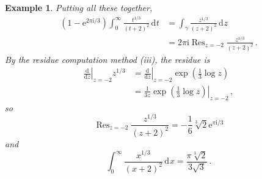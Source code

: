 \documentclass{article}
\theoremstyle{plain}\theoremheaderfont{\normalfont\itshape}\theorembodyfont{\rmfamily}\theoremseparator{.}\newtheorem*{rem}{Remark}\newtheorem*{ex}{Example}\newtheorem*{proof}{Proof}\newtheorem*{altp}{Alternative proof}\newtheorem*{con}{Consequences}\newtheorem*{notn}{Notations}\newtheorem*{cau}{Caution}\newtheorem*{term}{Terminology}\newtheorem*{keyex}{Key example}
\theoremstyle{plain}\theoremheaderfont{\normalfont\bfseries}\theorembodyfont{\rmfamily}\theoremseparator{.}\newtheorem{thm}{Theorem}[section]\newtheorem{lem}[thm]{Lemma}\newtheorem{prop}[thm]{Proposition}\newtheorem*{cor}{Corollary}\newtheorem{defn}[thm]{Definition}\newtheorem{clm}[thm]{Claim}\newtheorem{clminproof}{Claim}\newtheorem{leminproof}{Lemma}\newtheorem{app}{Application}
\theoremstyle{break}\theoremheaderfont{\normalfont\itshape}\theorembodyfont{\rmfamily}\theoremseparator{.\medskip}\newtheorem*{proofskip}{Proof}\newtheorem*{exs}{Examples}\newtheorem*{rems}{Remarks}\newtheorem*{rec}{Recall}\newtheorem*{ppts}{Properties}
\theoremstyle{break}\theoremheaderfont{\normalfont\bfseries}\theorembodyfont{\rmfamily}\theoremseparator{.\medskip}\newtheorem{lemskip}[thm]{Lemma}\newtheorem{defnskip}[thm]{Definition}\newtheorem{propskip}[thm]{Proposition}\newtheorem{thmskip}[thm]{Theorem}
\numberwithin{equation}{section}
\newcommand{\ii}{\mathrm{i}}
\newcommand{\ee}{\mathrm{e}}
\DeclareMathOperator*{\Res}{Res}
\newcommand{\dd}[2][]{\,\mathrm{d}^{#1} #2}
\newcommand{\dv}[2]{\frac{\mathrm{d}#1}{\mathrm{d}#2}}
\begin{document}
\begin{ex}
        Putting all these together,
        \begin{align*}
            (1-\ee^{2\pi \ii/3})\int_{0}^{\infty}\frac{t^{1/3}}{(t+2)^2}\dd{t}&=\int_{\gamma}\frac{z^{1/3}}{(z+2)^2}\dd{z}\\
            &=2\pi \ii\Res_{z=-2}\frac{z^{1/3}}{(z+2)^2}\,.
        \end{align*}
        By the residue computation method (iii), the residue is
        \begin{align*}
            \left.\dv{}{z}\right|_{z=-2}z^{1/3}&=\left.\dv{}{z}\right|_{z=-2}\exp\left(\frac{1}{3}\log z\right)\\
            &=\left.\frac{1}{3z}\exp\left(\frac{1}{3}\log z\right)\right|_{z=-2}\,,
        \end{align*}
        so
        \[\Res_{z=-2}\frac{z^{1/3}}{(z+2)^2}=-\frac{1}{6}\sqrt[3]{2}\ee^{\pi \ii/3}\]
        and
        \[\int_{0}^{\infty}\frac{x^{1/3}}{(x+2)^2}\dd{x}=\frac{\pi\sqrt[3]{2}}{3\sqrt{3}}\,.\]
    \end{ex}
\end{document}
